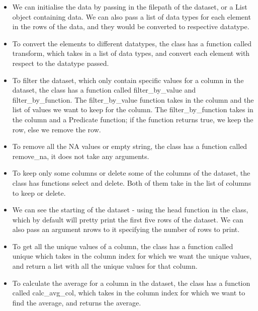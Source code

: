 \documentclass[a4paper, 11pt]{report}
\begin{document}
\begin{itemize}
    \item We can initialise the data by passing in the filepath of the dataset, or a List object containing data. We can also pass a list of data types for each element in the rows of the data, and they would be converted to respective datatype. \\

    \item To convert the elements to different datatypes, the class has a function called transform, which takes in a list of data types, and convert each element with respect to the datatype passed. \\

    \item To filter the dataset, which only contain specific values for a column in the dataset, the class has a function called filter\_by\_value and filter\_by\_function.
    The filter\_by\_value function takes in the column and the list of values we want to keep for the column. The filter\_by\_function takes in the column and a Predicate function; if the function returns true, we keep the row, else we remove the row.

    \item To remove all the NA values or empty string, the class has a function called remove\_na, it does not take any arguments. \\

    \item To keep only some columns or delete some of the columns of the dataset, the class has functions select and delete. Both of them take in the list of columns to keep or delete. \\

    \item We can see the starting of the dataset - using the head function in the class, which by default will pretty print the first five rows of the dataset. We can also pass an argument nrows to it specifying the number of rows to print.\\

    \item To get all the unique values of a column, the class has a function called unique which takes in the column index for which we want the unique values, and return a list with all the unique values for that column.\\

    \item To calculate the average for a column in the dataset, the class has a function called calc\_avg\_col, which takes in the column index for which we want to find the average, and returns the average. \\


\end{itemize}
\end{document}
